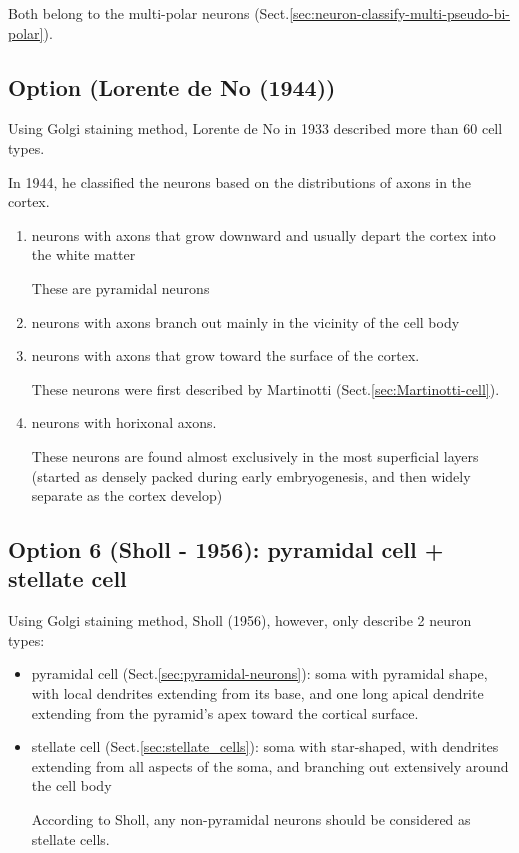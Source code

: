 Both belong to the multi-polar neurons
(Sect.\ref{sec:neuron-classify-multi-pseudo-bi-polar}).

\subsection{Option (Lorente de No (1944))}

Using Golgi staining method, Lorente de No in 1933 described more than 60 cell
types. 

In 1944, he classified the neurons based on the distributions of axons in
the cortex.
\begin{enumerate}
  \item neurons with axons that grow downward and usually depart the cortex into
  the white matter
  
  These are pyramidal neurons
  
  \item neurons with axons branch out mainly in the vicinity of the cell body
  
  \item neurons with axons that grow toward the surface of the cortex.
  
  These neurons were first described by Martinotti
  (Sect.\ref{sec:Martinotti-cell}).
  
  \item neurons with horixonal axons.
  
  These neurons are found almost exclusively in the most superficial layers
  (started as densely packed during early embryogenesis, and then widely
  separate as the cortex develop)
\end{enumerate}

\subsection{Option 6 (Sholl - 1956): pyramidal cell + stellate cell}

Using Golgi staining method, Sholl (1956), however, only describe 2
neuron types:
\begin{itemize}
  \item pyramidal cell (Sect.\ref{sec:pyramidal-neurons}): soma with pyramidal
  shape, with local dendrites extending from its base, and one long apical
  dendrite extending from the pyramid's apex toward the cortical surface.
  
  
  \item stellate cell (Sect.\ref{sec:stellate_cells}): soma with star-shaped,
  with dendrites extending from all aspects of the soma, and branching out
  extensively around the cell body
  
According to Sholl, any non-pyramidal neurons should be considered as stellate
cells.
\end{itemize}

